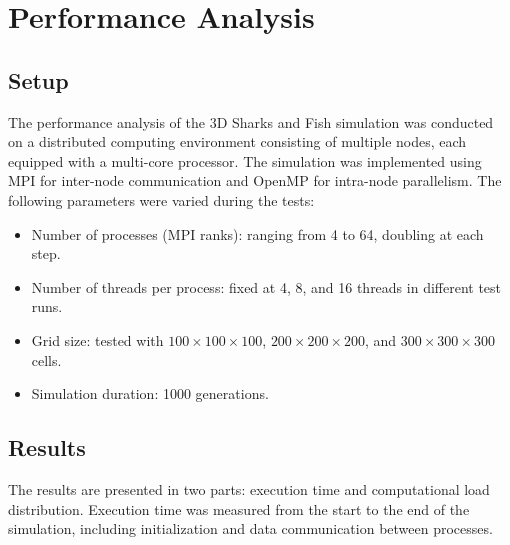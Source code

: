 \documentclass[conference,compsoc]{IEEEtran}
\begin{document}


\section{Performance Analysis}

\subsection{Setup}
The performance analysis of the 3D Sharks and Fish simulation was conducted on a distributed computing environment consisting of multiple nodes, each equipped with a multi-core processor. The simulation was implemented using MPI for inter-node communication and OpenMP for intra-node parallelism. The following parameters were varied during the tests:
\begin{itemize}
    \item Number of processes (MPI ranks): ranging from 4 to 64, doubling at each step.
    \item Number of threads per process: fixed at 4, 8, and 16 threads in different test runs.
    \item Grid size: tested with $100 \times 100 \times 100$, $200 \times 200 \times 200$, and $300 \times 300 \times 300$ cells.
    \item Simulation duration: 1000 generations.
\end{itemize}

\subsection{Results}
The results are presented in two parts: execution time and computational load distribution. Execution time was measured from the start to the end of the simulation, including initialization and data communication between processes.
\end{document}
